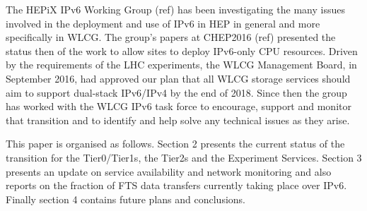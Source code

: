 
The HEPiX IPv6 Working Group (ref) has been investigating the many issues involved in the deployment and use of
IPv6 in HEP in general and more specifically in WLCG. The group's papers at CHEP2016 (ref)
presented the status then of the work to allow sites to deploy IPv6-only CPU resources. Driven by the
requirements of the LHC experiments, the WLCG Management Board, in September 2016, had approved our plan
that all WLCG storage services should aim to support dual-stack IPv6/IPv4 by the end of 2018. Since then the
group has worked with the WLCG IPv6 task force to encourage, support and monitor that transition and to identify and help
solve any technical issues as they arise.

This paper is organised as follows.  Section 2 presents the current status of the transition for the Tier0/Tier1s, the Tier2s and the Experiment Services.
Section 3 presents an update on service availability and network monitoring and also reports on the fraction of FTS data transfers currently taking place over IPv6.
Finally section 4 contains future plans and conclusions. 

 
